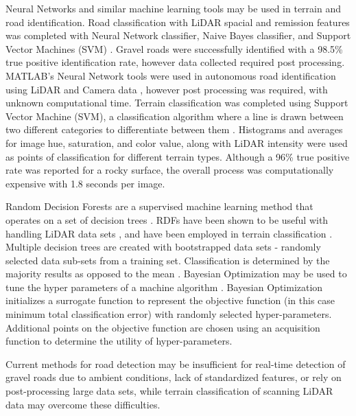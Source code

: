 \documentclass[journal,onecolumn]{IEEEtran}
\begin{document}
	{Neural Networks and similar machine learning tools may be used in terrain and road identification. Road classification with LiDAR spacial and remission features was completed with Neural Network classifier, Naive Bayes classifier, and Support Vector Machines (SVM) \cite{wang_road_nodate,wang_two-stage_2018}. Gravel roads were successfully identified with a 98.5\% true positive identification rate, however data collected required post processing. MATLAB's Neural Network tools were used in autonomous road identification using LiDAR and Camera data \cite{rasmussen_combining_2002}, however post processing was required, with unknown computational time.  Terrain classification was completed using Support Vector Machine (SVM), a classification algorithm where a line is drawn between two different categories to differentiate between them \cite{breiman_random_2001}. Histograms and averages for image hue, saturation, and color value, along with LiDAR intensity were used as points of classification for different terrain types. Although a 96\% true positive rate was reported for a rocky surface, the overall process was computationally expensive with 1.8 seconds per image.}
	
	{Random Decision Forests are a supervised machine learning method that operates on a set of decision trees \cite{ho_random_1995}. RDFs have been shown to be useful with handling LiDAR data sets \cite{breiman_random_2001}, and have been employed in terrain classification \cite{laible_3d_2012,laible_map_building,laible_terrain_2013,khan_high_2011,reymann_improving_2015,schilling_geometric_2017, wietrzykowski_context-aware_2019}. Multiple decision trees are created with bootstrapped data sets - randomly selected data sub-sets from a training set. Classification is determined by the majority results as opposed to the mean \cite{breiman_random_2001,ho_random_1995}. Bayesian Optimization may be used to tune the hyper parameters of a machine algorithm \cite{noauthor_bayesian_nodate, snoek_practical_2012}. Bayesian Optimization initializes a surrogate function to represent the objective function (in this case minimum total classification error) with randomly selected hyper-parameters. Additional points on the objective function are chosen using an acquisition function to determine the utility of hyper-parameters.}
	
	{Current methods for road detection may be insufficient for real-time detection of gravel roads due to ambient conditions, lack of standardized features, or rely on post-processing large data sets, while terrain classification of scanning LiDAR data may overcome these difficulties.}
	
\end{document}
